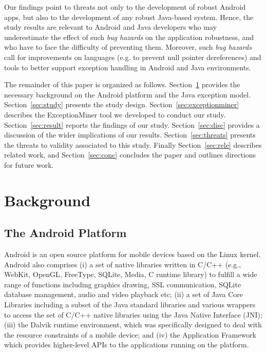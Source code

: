 \documentclass[conference]{IEEEtran}
\begin{document}
Our findings point to threats not only to the development of robust Android apps, 
but also to the development of any robust Java-based system. 
Hence, the study results are relevant to Android and Java developers who may underestimate the effect of such
 \emph{bug hazards} on the application robustness,
and who have to face the difficulty of preventing them.
Moreover, such \emph{bug hazards} 
call for improvements on languages (e.g. to prevent null pointer dereferences) and tools to better support exception handling in Android and Java environments.

The remainder of this paper is organized as follows. 
Section~\ref{sec:back} provides the necessary
background on the Android platform and the Java exception model. 
Section~\ref{sec:study} presents the study design. 
Section~\ref{sec:exceptionminer} describes the ExceptionMiner tool we developed to conduct our study.
Section~\ref{sec:result} reports the findings of our study.
Section~\ref{sec:disc} provides a discussion of the wider implications of our results.
Section~\ref{sec:threats} presents the threats to validity associated to this study. 
Finally Section~\ref{sec:rele} describes related work, 
and Section~\ref{sec:conc} concludes the paper and outlines
directions for future work.

\section{Background}
\label{sec:back}

\subsection{The Android Platform}
Android is an open source platform for mobile devices based on the Linux kernel.
Android also comprises (i) a set of native libraries written in C/C++ 
(e.g., WebKit, OpenGL, FreeType, SQLite, Media, C runtime library) to
fulfill a wide range of functions including graphics drawing, SSL communication, 
SQLite database management, audio and video playback etc; (ii) a set of Java Core Libraries 
including a subset of the Java standard libraries and various wrappers to access the set of C/C++ 
native libraries using the Java Native Interface (JNI); (iii) the Dalvik runtime environment, which was specifically designed to deal with the resource constraints of a mobile device; 
 and (iv) the Application Framework which provides higher-level APIs to the applications
 running on the platform.
\end{document}
